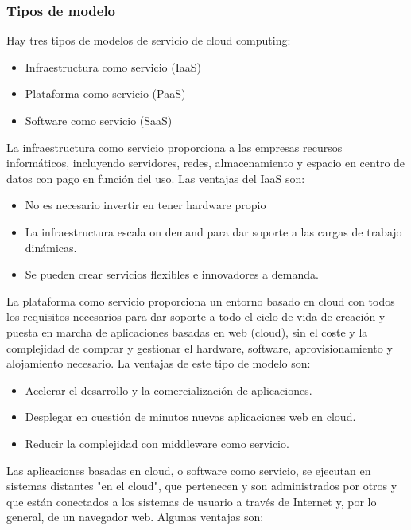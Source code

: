 \subsubsection{Tipos de modelo}
Hay tres tipos de modelos de servicio de cloud computing:

\begin{itemize}
    \item Infraestructura como servicio (IaaS)
    \item Plataforma como servicio (PaaS)
    \item Software como servicio (SaaS)
\end{itemize}

La infraestructura como servicio proporciona a las empresas recursos informáticos, incluyendo servidores, redes, almacenamiento y espacio en centro de datos con pago en función del uso. Las ventajas del IaaS son:

\begin{itemize}
    \item No es necesario invertir en tener hardware propio
    \item La infraestructura escala on demand para dar soporte a las cargas de trabajo dinámicas.
    \item Se pueden crear servicios flexibles e innovadores a demanda.
\end{itemize}

La plataforma como servicio proporciona un entorno basado en cloud con todos los requisitos necesarios para dar soporte a todo el ciclo de vida de creación y puesta en marcha de aplicaciones basadas en web (cloud), sin el coste y la complejidad de comprar y gestionar el hardware, software, aprovisionamiento y alojamiento necesario. La ventajas de este tipo de modelo son:

\begin{itemize}
    \item Acelerar el desarrollo y la comercialización de aplicaciones.
    \item Desplegar en cuestión de minutos nuevas aplicaciones web en cloud.
    \item Reducir la complejidad con middleware como servicio.
\end{itemize}

Las aplicaciones basadas en cloud, o software como servicio, se ejecutan en sistemas distantes "en el cloud", que pertenecen y son administrados por otros y que están conectados a los sistemas de usuario a través de Internet y, por lo general, de un navegador web. Algunas ventajas son:

